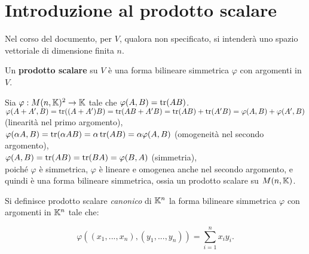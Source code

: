 \chapter{Introduzione al prodotto scalare}

\begin{note}
	Nel corso del documento, per $V$, qualora non specificato, si intenderà uno spazio vettoriale di dimensione
	finita $n$.
\end{note}

\begin{definition}
	Un \textbf{prodotto scalare} su $V$ è una forma bilineare simmetrica $\varphi$ con argomenti in $V$.
\end{definition}

\begin{example}
	Sia $\varphi : M(n, \mathbb{K})^2 \to \mathbb{K}$ tale che $\varphi(A, B) = \operatorname{tr}(AB)$. \\
	
	\li $\varphi(A + A', B) = \operatorname{tr}((A + A')B) = \operatorname{tr}(AB + A'B) = \operatorname{tr}(AB) + \operatorname{tr}(A'B) = \varphi(A, B) + \varphi(A', B)$ (linearità
	nel primo argomento), \\
	\li $\varphi(\alpha A, B) = \operatorname{tr}(\alpha A B) = \alpha \operatorname{tr}(AB) = \alpha \varphi(A, B)$ (omogeneità nel secondo argomento), \\
	\li $\varphi(A, B) = \operatorname{tr}(AB) = \operatorname{tr}(BA) = \varphi(B, A)$ (simmetria), \\
	\li poiché $\varphi$ è simmetrica, $\varphi$ è lineare e omogenea anche nel secondo argomento, e quindi è una
	forma bilineare simmetrica, ossia un prodotto scalare su $M(n, \mathbb{K})$.
\end{example}

\begin{definition}
	Si definisce prodotto scalare \textit{canonico} di $\mathbb{K}^n$ la forma bilineare simmetrica $\varphi$ con
	argomenti in $\mathbb{K}^n$ tale che:
	
	\[ \varphi((x_1, ..., x_n), (y_1, ..., y_n)) = \sum_{i=1}^n x_i y_i. \]
\end{definition}

